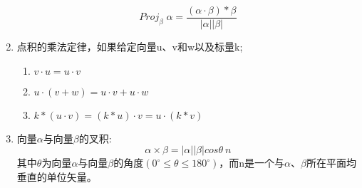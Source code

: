 \documentclass[a4paper,10pt]{article}
\begin{document}
\begin{CJK}{UTF8}{song}
\begin{enumerate}
\begin{displaymath}
Proj_{\beta}\;\alpha=\frac{(\alpha\cdot\beta)*\beta}{|\alpha||\beta|}
\end{displaymath}
\item 点积的乘法定律，如果给定向量u、v和w以及标量k;
\begin{enumerate}
\item $v\cdot u=u\cdot v $
\item $u \cdot (v+w)=u \cdot v + u \cdot w $
\item $k*(u\cdot v)=(k*u)\cdot v=u\cdot(k*v) $
\end{enumerate}
\item 向量$\alpha$与向量$\beta$的叉积:
\begin{displaymath}
\alpha\times\beta=|\alpha||\beta|cos\theta\: n
\end{displaymath}
其中$\theta$为向量$\alpha$与向量$\beta$的角度$(0^\circ\leq\theta\leq 180^\circ)$，而n是一个与$\alpha$、$\beta$所在平面均垂直的单位矢量。




\end{enumerate}


\end{CJK}
\end{document}

